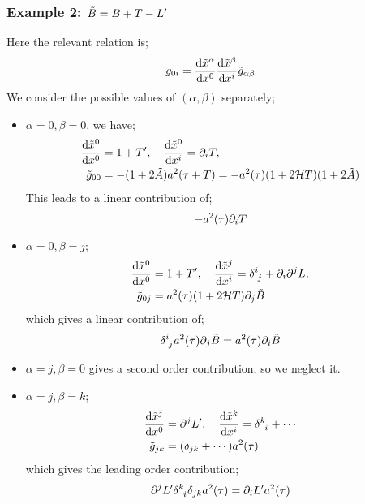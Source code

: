 \subsubsection*{Example 2: $\tilde{B} = B + T - L^{\prime}$}
Here the relevant relation is;
\begin{equation*}
g_{0i} = \frac{\text{d} \tilde{x}^{\alpha}}{\text{d} x^{0}}\frac{\text{d} \tilde{x}^{\beta}}{\text{d} x^{i}}\tilde{g}_{\alpha\beta}
\end{equation*}
We consider the possible values of $(\alpha, \beta)$ separately;
\begin{itemize}
\item $\alpha = 0, \beta = 0$, we have;
\begin{align*}
\frac{\text{d} \tilde{x}^{0}}{\text{d} x^{0}} &= 1 + T^{\prime}, \quad \frac{\text{d} \tilde{x}^{0}}{\text{d} x^{i}} = \partial_i T, \\
\tilde{g}_{00} &= -(1 + 2\tilde{A})a^{2}(\tau + T) = -a^{2}(\tau)(1 + 2\mathcal{H} T)(1 + 2\tilde{A})
\end{align*}
This leads to a linear contribution of;
\begin{equation*}
-a^2(\tau) \partial_i T
\end{equation*}
\item $\alpha = 0, \beta = j$;
\begin{align*}
\frac{\ud \tilde{x}^{0}}{\ud x^{0}} &= 1 + T\pr, \quad \frac{\ud \tilde{x}^{j}}{\ud x^{i}} = \delta\indices{^{i}_{j}} + \del_i \del^j L, \\
\tilde{g}_{0j} &= a^{2}(\tau)(1 + 2\hamilt T)\del_j \tilde{B}
\end{align*}
which gives a linear contribution of;
\begin{equation*}
\delta\indices{^{i}_{j}}a^2(\tau)\del_j \tilde{B} = a^{2}(\tau)\del_i \tilde{B}
\end{equation*}
\item $\alpha = j, \beta = 0$ gives a second order contribution, so we neglect it.
\item $\alpha = j, \beta = k$;
\begin{align*}
\frac{\ud \tilde{x}^{j}}{\ud x^{0}} &= \del^j L\pr, \quad \frac{\ud \tilde{x}^{k}}{\ud x^{i}} = \delta\indices{^{k}_{i}} + \cdots \\
\tilde{g}_{jk} &= (\delta_{jk} + \cdots)a^2(\tau)
\end{align*}
which gives the leading order contribution;
\begin{equation*}
\del^{j}L\pr \delta\indices{^{k}_{i}} \delta_{jk} a^2(\tau) = \del_i L\pr a^2(\tau)
\end{equation*}
\end{itemize}
